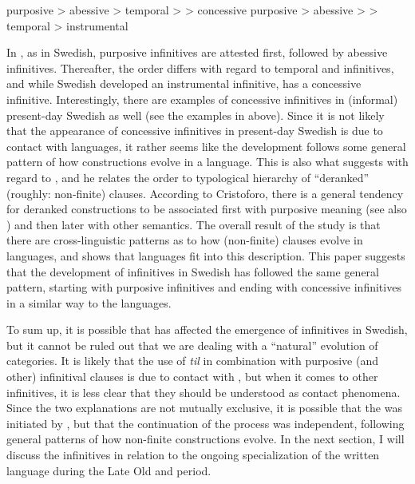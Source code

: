 \documentclass[output=paper]{langscibook}
\begin{document}
\ea
\label{ex:kalm:31}
purposive > abessive > temporal >  > concessive
\ex
\label{ex:kalm:32}
purposive > abessive >  > temporal > instrumental
\z

In , as in Swedish, purposive infinitives are attested first, followed by abessive infinitives. Thereafter, the order differs with regard to temporal and  infinitives, and while Swedish developed an instrumental infinitive,  has a concessive infinitive. Interestingly, there are examples of concessive infinitives in (informal) present-day Swedish as well (see the examples in  above). Since it is not likely that the appearance of concessive infinitives in present-day Swedish is due to contact with  languages, it rather seems like the development follows some general pattern of how  constructions evolve in a language. This is also what \citet{Schulte2007Prepositional, Schulte2007What} suggests with regard to , and he relates the order to  typological hierarchy of “deranked” (roughly: non-finite)  clauses. According to Cristoforo, there is a general tendency for deranked constructions to be associated first with purposive meaning (see also \citealt{Haspelmath1989}) and then later with other semantics. The overall result of the study is that there are cross-linguistic patterns as to how  (non-finite) clauses evolve in languages, and \citet{Schulte2007Prepositional, Schulte2007What} shows that  languages fit into this description. This paper suggests that the development of  infinitives in Swedish has followed the same general pattern, starting with purposive infinitives and ending with concessive infinitives in a similar way to the  languages.



To sum up, it is possible that  has affected the emergence of  infinitives in Swedish, but it cannot be ruled out that we are dealing with a “natural” evolution of  categories. It is likely that the use of \textit{til} in combination with purposive (and other) infinitival clauses is due to contact with , but when it comes to other  infinitives, it is less clear that they should be understood as contact phenomena. Since the two explanations are not mutually exclusive, it is possible that the  was initiated by , but that the continuation of the process was independent, following general patterns of how  non-finite constructions evolve. In the next section, I will discuss the  infinitives in relation to the ongoing specialization of the written language during the Late Old and  period. 
\end{document}

